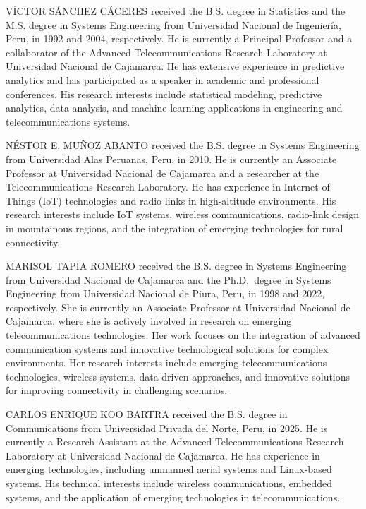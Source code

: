 \documentclass{ieeeaccess}
\begin{document}
\begin{IEEEbiographynophoto}{VÍCTOR SÁNCHEZ CÁCERES}
received the B.S. degree in Statistics and the M.S. degree in Systems Engineering from Universidad Nacional de Ingeniería, Peru, in 1992 and 2004, respectively. He is currently a Principal Professor and a collaborator of the Advanced Telecommunications Research Laboratory at Universidad Nacional de Cajamarca. He has extensive experience in predictive analytics and has participated as a speaker in academic and professional conferences. His research interests include statistical modeling, predictive analytics, data analysis, and machine learning applications in engineering and telecommunications systems.
\end{IEEEbiographynophoto}

\begin{IEEEbiographynophoto}{NÉSTOR E. MUÑOZ ABANTO}
received the B.S. degree in Systems Engineering from Universidad Alas Peruanas, Peru, in 2010. He is currently an Associate Professor at Universidad Nacional de Cajamarca and a researcher at the Telecommunications Research Laboratory. He has experience in Internet of Things (IoT) technologies and radio links in high-altitude environments. His research interests include IoT systems, wireless communications, radio-link design in mountainous regions, and the integration of emerging technologies for rural connectivity.
\end{IEEEbiographynophoto}

\begin{IEEEbiographynophoto}{MARISOL TAPIA ROMERO}
received the B.S. degree in Systems Engineering from Universidad Nacional de Cajamarca and the Ph.D.~degree in Systems Engineering from Universidad Nacional de Piura, Peru, in 1998 and 2022, respectively. She is currently an Associate Professor at Universidad Nacional de Cajamarca, where she is actively involved in research on emerging telecommunications technologies. Her work focuses on the integration of advanced communication systems and innovative technological solutions for complex environments. Her research interests include emerging telecommunications technologies, wireless systems, data-driven approaches, and innovative solutions for improving connectivity in challenging scenarios.
\end{IEEEbiographynophoto}

\begin{IEEEbiographynophoto}{CARLOS ENRIQUE KOO BARTRA}
received the B.S. degree in Communications from Universidad Privada del Norte, Peru, in 2025. He is currently a Research Assistant at the Advanced Telecommunications Research Laboratory at Universidad Nacional de Cajamarca. He has experience in emerging technologies, including unmanned aerial systems and Linux-based systems. His technical interests include wireless communications, embedded systems, and the application of emerging technologies in telecommunications.
\end{IEEEbiographynophoto}
\EOD
\end{document}
